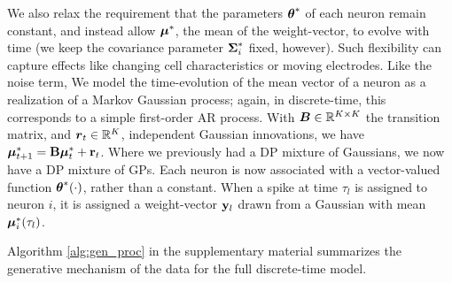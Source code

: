 We also relax the requirement that the parameters $\boldsymbol{\theta}^*$ of each neuron remain constant, and instead allow $\boldsymbol{\mu}^*$, the mean of the weight-vector,
to evolve with time (we keep the covariance parameter $\boldsymbol{\Sigma}^*_i$ fixed, however). Such flexibility can capture effects like changing cell 
characteristics or moving electrodes.
Like the noise term, We model the time-evolution of the mean vector of a neuron as a realization of a Markov Gaussian process; again, in 
discrete-time, this corresponds to a simple first-order 
AR process. With $\boldsymbol{B} \in \mathbb{R}^{K \times K}$ the transition matrix, and $\boldsymbol{r}_t \in \mathbb{R}^K$, 
independent Gaussian {innovations}, we have
% 
  $\boldsymbol{\mu}^*_{t+1} = \mathbf{B} \boldsymbol{\mu}^*_t + \mathbf{r}_t$.
Where we previously had a DP mixture of Gaussians, we now have a DP mixture of GPs. Each neuron is now associated with a vector-valued function 
$\boldsymbol{\theta}^*(\cdot)$, rather than a constant. When a spike at time $\tau_l$ is assigned to neuron $i$, it is assigned a weight-vector $\mathbf{y}_l$ drawn from a 
Gaussian with mean $\boldsymbol{\mu}^*_i(\tau_l)$. %

Algorithm \ref{alg:gen_proc} in the supplementary material summarizes the generative mechanism of the data for the full discrete-time model.
% 
